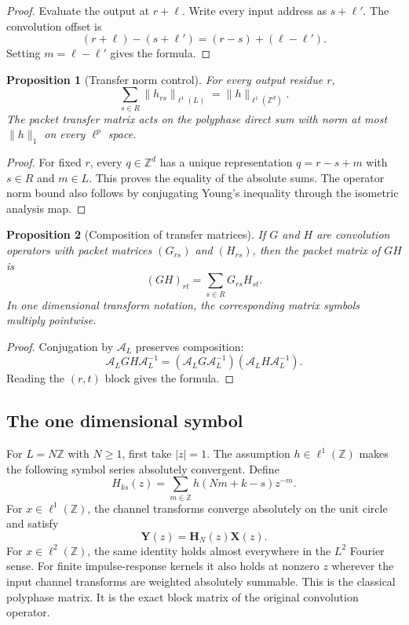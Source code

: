 \documentclass{aomart}
\newtheorem{proposition}[proposition]{Proposition}
\theoremstyle{definition}
\theoremstyle{remark}
\newcommand{\ZZ}{\mathbb Z}
\newcommand{\Acal}{\mathcal A}
\begin{document}
\begin{proof}
Evaluate the output at \(r+\ell\). Write every input address as \(s+\ell'\). The convolution offset is
\[
(r+\ell)-(s+\ell')
=(r-s)+(\ell-\ell').
\]
Setting \(m=\ell-\ell'\) gives the formula.
\end{proof}

\begin{proposition}[Transfer norm control]\label{prop:transfer_norm_control}
For every output residue \(r\),
\[
\sum_{s\in R}\|h_{rs}\|_{\ell^1(L)}
=
\|h\|_{\ell^1(\ZZ^d)}.
\]
The packet transfer matrix acts on the polyphase direct sum with norm at most \(\|h\|_1\) on every \(\ell^p\) space.
\end{proposition}

\begin{proof}
For fixed \(r\), every \(q\in\ZZ^d\) has a unique representation \(q=r-s+m\) with \(s\in R\) and \(m\in L\). This proves the equality of the absolute sums. The operator norm bound also follows by conjugating Young's inequality through the isometric analysis map.
\end{proof}

\begin{proposition}[Composition of transfer matrices]\label{prop:transfer_composition}
If \(G\) and \(H\) are convolution operators with packet matrices \((G_{rs})\) and \((H_{rs})\), then the packet matrix of \(GH\) is
\[
(GH)_{rt}
=
\sum_{s\in R}G_{rs}H_{st}.
\]
In one dimensional transform notation, the corresponding matrix symbols multiply pointwise.
\end{proposition}

\begin{proof}
Conjugation by \(\Acal_L\) preserves composition:
\[
\Acal_LGH\Acal_L^{-1}
=
(\Acal_LG\Acal_L^{-1})(\Acal_LH\Acal_L^{-1}).
\]
Reading the \((r,t)\) block gives the formula.
\end{proof}

\subsection{The one dimensional symbol}

For \(L=N\ZZ\) with \(N\geq1\), first take \(|z|=1\). The assumption \(h\in\ell^1(\ZZ)\) makes the following symbol series absolutely convergent. Define
\[
H_{ks}(z)=\sum_{m\in\ZZ}h(Nm+k-s)z^{-m}.
\]
For \(x\in\ell^1(\ZZ)\), the channel transforms converge absolutely on the unit circle and satisfy
\[
\bm Y(z)=\bm H_N(z)\bm X(z).
\]
For \(x\in\ell^2(\ZZ)\), the same identity holds almost everywhere in the \(L^2\) Fourier sense. For finite impulse-response kernels it also holds at nonzero \(z\) wherever the input channel transforms are weighted absolutely summable. This is the classical polyphase matrix. It is the exact block matrix of the original convolution operator.
\end{document}
